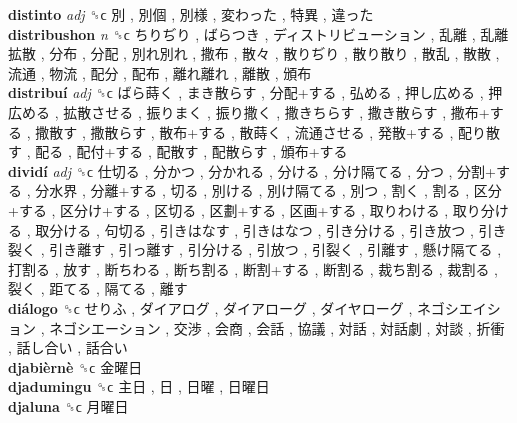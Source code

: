 \textbf{distinto} \emph{adj}  ␝ϲ   別 ,  別個 ,  別様 ,  変わった ,  特異 ,  違った   \\
\textbf{distribushon} \emph{n}  ␝ϲ   ちりぢり ,  ばらつき ,  ディストリビューション ,  乱離 ,  乱離拡散 ,  分布 ,  分配 ,  別れ別れ ,  撒布 ,  散々 ,  散りぢり ,  散り散り ,  散乱 ,  散散 ,  流通 ,  物流 ,  配分 ,  配布 ,  離れ離れ ,  離散 ,  頒布   \\
\textbf{distribuí} \emph{adj}  ␝ϲ   ばら蒔く ,  まき散らす ,  分配+する ,  弘める ,  押し広める ,  押広める ,  拡散させる ,  振りまく ,  振り撒く ,  撒きちらす ,  撒き散らす ,  撒布+する ,  撒散す ,  撒散らす ,  散布+する ,  散蒔く ,  流通させる ,  発散+する ,  配り散す ,  配る ,  配付+する ,  配散す ,  配散らす ,  頒布+する   \\
\textbf{dividí} \emph{adj}  ␝ϲ   仕切る ,  分かつ ,  分かれる ,  分ける ,  分け隔てる ,  分つ ,  分割+する ,  分水界 ,  分離+する ,  切る ,  別ける ,  別け隔てる ,  別つ ,  割く ,  割る ,  区分+する ,  区分け+する ,  区切る ,  区劃+する ,  区画+する ,  取りわける ,  取り分ける ,  取分ける ,  句切る ,  引きはなす ,  引きはなつ ,  引き分ける ,  引き放つ ,  引き裂く ,  引き離す ,  引っ離す ,  引分ける ,  引放つ ,  引裂く ,  引離す ,  懸け隔てる ,  打割る ,  放す ,  断ちわる ,  断ち割る ,  断割+する ,  断割る ,  裁ち割る ,  裁割る ,  裂く ,  距てる ,  隔てる ,  離す   \\
\textbf{diálogo} ␝ϲ   せりふ ,  ダイアログ ,  ダイアローグ ,  ダイヤローグ ,  ネゴシエイション ,  ネゴシエーション ,  交渉 ,  会商 ,  会話 ,  協議 ,  対話 ,  対話劇 ,  対談 ,  折衝 ,  話し合い ,  話合い   \\
\textbf{djabièrnè} ␝ϲ   金曜日   \\
\textbf{djadumingu} ␝ϲ   主日 ,  日 ,  日曜 ,  日曜日   \\
\textbf{djaluna} ␝ϲ   月曜日   \\
